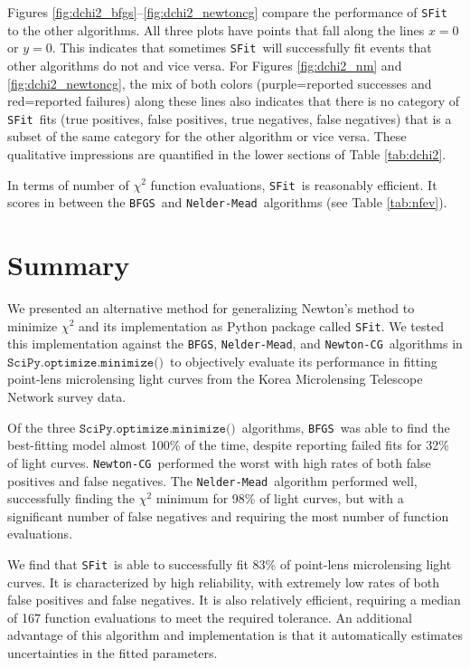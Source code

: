 \documentclass[preprint]{aastex631}
\newcommand{\minimize}{$\texttt{SciPy.optimize.minimize()}$}
\newcommand{\neldermead}{\texttt{Nelder-Mead}}
\newcommand{\newtoncg}{\texttt{Newton-CG}}
\newcommand{\bfgs}{\texttt{BFGS}}
\newcommand{\sfit}{\texttt{SFit}}
\begin{document}
Figures \ref{fig:dchi2_bfgs}--\ref{fig:dchi2_newtoncg} compare the performance of \sfit\, to the other algorithms. All three plots have points that fall along the lines $x=0$ or $y=0$. This indicates that sometimes \sfit\, will successfully fit events that other algorithms do not and vice versa. For Figures \ref{fig:dchi2_nm} and \ref{fig:dchi2_newtoncg}, the mix of both colors (purple=reported successes and red=reported failures) along these lines also indicates that there is no category of \sfit\, fits (true positives, false positives, true negatives, false negatives) that is a subset of the same category for the other algorithm or vice versa. These qualitative impressions are quantified in the lower sections of Table \ref{tab:dchi2}.

In terms of number of $\chi^2$ function evaluations, \sfit\, is reasonably efficient. It scores in between the \bfgs\, and \neldermead\, algorithms (see Table \ref{tab:nfev}).

{\section{Summary}
\label{sec:summary}}

We presented an alternative method for generalizing Newton's method to minimize $\chi^2$ and its implementation as Python package called \sfit. We tested this implementation against the \bfgs, \neldermead, and \newtoncg\, algorithms in \minimize\, to objectively evaluate its performance in fitting point-lens microlensing light curves from the Korea Microlensing Telescope Network survey data. 

Of the three \minimize\, algorithms, \bfgs\, was able to find the best-fitting model almost 100\% of the time, despite reporting failed fits for 32\% of light curves. \newtoncg\, performed the worst with high rates of both false positives and false negatives. The \neldermead\, algorithm performed well, successfully finding the $\chi^2$ minimum for 98\% of light curves, but with a significant number of false negatives and requiring the most number of function evaluations.

We find that \sfit\, is able to successfully fit 83\% of point-lens microlensing light curves. It is characterized by high reliability, with extremely low rates of both false positives and false negatives. It is also relatively efficient, requiring a median of 167 function evaluations to meet the required tolerance. An additional advantage of this algorithm and implementation is that it automatically estimates uncertainties in the fitted parameters.
\end{document}
